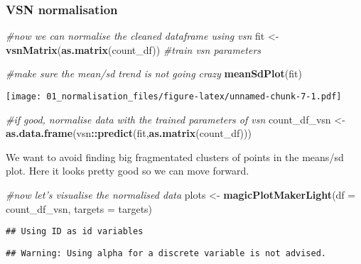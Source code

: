 \documentclass[]{article}
\newenvironment{Shaded}{\begin{snugshade}}{\end{snugshade}}
\newcommand{\CommentTok}[1]{\textcolor[rgb]{0.56,0.35,0.01}{\textit{#1}}}
\newcommand{\DataTypeTok}[1]{\textcolor[rgb]{0.13,0.29,0.53}{#1}}
\newcommand{\KeywordTok}[1]{\textcolor[rgb]{0.13,0.29,0.53}{\textbf{#1}}}
\newcommand{\NormalTok}[1]{#1}
\newcommand{\OperatorTok}[1]{\textcolor[rgb]{0.81,0.36,0.00}{\textbf{#1}}}
\newcommand{\StringTok}[1]{\textcolor[rgb]{0.31,0.60,0.02}{#1}}
\begin{document}
\hypertarget{vsn-normalisation}{%
\subsubsection{VSN normalisation}\label{vsn-normalisation}}

\begin{Shaded}
\begin{Highlighting}[]
\CommentTok{#now we can normalise the cleaned dataframe using vsn}
\NormalTok{fit <-}\StringTok{ }\KeywordTok{vsnMatrix}\NormalTok{(}\KeywordTok{as.matrix}\NormalTok{(count_df)) }\CommentTok{#train vsn parameters}

\CommentTok{#make sure the mean/sd trend is not going crazy}
\KeywordTok{meanSdPlot}\NormalTok{(fit)}
\end{Highlighting}
\end{Shaded}

\texttt{[image: 01\_normalisation\_files/figure-latex/unnamed-chunk-7-1.pdf]}

\begin{Shaded}
\begin{Highlighting}[]
\CommentTok{#if good, normalise data with the trained parameters of vsn}
\NormalTok{count_df_vsn <-}\StringTok{ }\KeywordTok{as.data.frame}\NormalTok{(vsn}\OperatorTok{::}\KeywordTok{predict}\NormalTok{(fit,}\KeywordTok{as.matrix}\NormalTok{(count_df)))}
\end{Highlighting}
\end{Shaded}

We want to avoid finding big fragmentated clusters of points in the
means/sd plot. Here it looks pretty good so we can move forward.

\begin{Shaded}
\begin{Highlighting}[]
\CommentTok{#now let's visualise the normalised data}
\NormalTok{plots <-}\StringTok{ }\KeywordTok{magicPlotMakerLight}\NormalTok{(}\DataTypeTok{df =}\NormalTok{ count_df_vsn, }\DataTypeTok{targets =}\NormalTok{ targets) }
\end{Highlighting}
\end{Shaded}

\begin{verbatim}
## Using ID as id variables
\end{verbatim}

\begin{verbatim}
## Warning: Using alpha for a discrete variable is not advised.
\end{verbatim}
\end{document}
